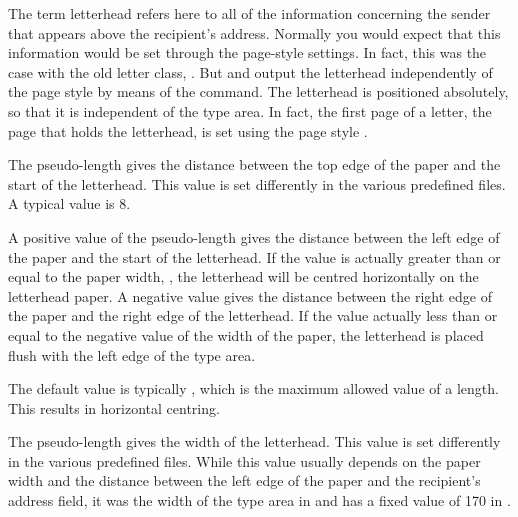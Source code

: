 The term letterhead refers here to all of the information concerning the
sender that appears above the recipient's address. Normally you would expect
that this information would be set through the page-style settings. In fact,
this was the case with the old letter class, .
But  and  output the
letterhead independently of the page style by means of the
 command.
\iftrue%
  The letterhead is positioned absolutely, so that it is independent of the
  type area. In fact, the first page of a letter, the page that holds the
  letterhead, is set using the page style
  .%
\fi


\begin{Declaration}
\end{Declaration}
The  pseudo-length gives the distance between the top
edge of the paper and the start of the letterhead. This value is set
differently in the various predefined
 files. A
typical value is 8.%
\EndIndexGroup


\begin{Declaration}
\end{Declaration}
A positive value of the
 pseudo-length gives
the distance between the left edge of the paper and the start of the
letterhead. If the value is actually greater than or
equal to the paper width,
,
the letterhead will be centred horizontally on the letterhead paper. A
negative value gives the distance between the right edge of the paper and the
right edge of the letterhead. If the value actually less than or equal to the
negative value of the width of the paper, the letterhead is placed flush with
the left edge of the type area.

The default value is typically
, which is the maximum allowed value of
a length. This results in horizontal centring.%
\EndIndexGroup


\begin{Declaration}
\end{Declaration}
The  pseudo-length gives the width of the letterhead.
This value is set differently in the various predefined 
files. While this
value usually depends on the paper width and the distance between the left
edge of the paper and the recipient's address field, it was the width of the
type area in  and has a fixed value of 170 in
.%
\EndIndexGroup


